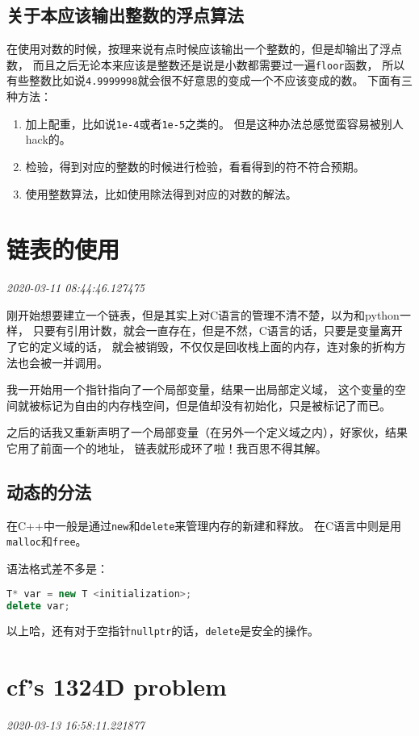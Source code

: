 \documentclass{peterlitsdoc}
\newcommand{\timetx}[1]
    {\par\noindent\emph{\pltgray\small #1}\vspace{2em}}
\newcommand{\vb}{\verb}
\begin{document}
\subsection{关于本应该输出整数的浮点算法}
在使用对数的时候，按理来说有点时候应该输出一个整数的，但是却输出了浮点数，
而且之后无论本来应该是整数还是说是小数都需要过一遍\vb|floor|函数，
所以有些整数比如说\vb|4.9999998|就会很不好意思的变成一个不应该变成的数。
下面有三种方法：

\begin{enumerate}
\item 加上配重，比如说\vb|1e-4|或者\vb|1e-5|之类的。
      但是这种办法总感觉蛮容易被别人hack的。
\item 检验，得到对应的整数的时候进行检验，看看得到的符不符合预期。
\item 使用整数算法，比如使用除法得到对应的对数的解法。
\end{enumerate}


\section{链表的使用}\timetx{2020-03-11 08:44:46.127475}

刚开始想要建立一个链表，但是其实上对C语言的管理不清不楚，以为和python一样，
只要有引用计数，就会一直存在，但是不然，C语言的话，只要是变量离开了它的定义域的话，
就会被销毁，不仅仅是回收栈上面的内存，连对象的折构方法也会被一并调用。

我一开始用一个指针指向了一个局部变量，结果一出局部定义域，
这个变量的空间就被标记为自由的内存栈空间，但是值却没有初始化，只是被标记了而已。

之后的话我又重新声明了一个局部变量（在另外一个定义域之内），好家伙，结果它用了前面一个的地址，
链表就形成环了啦！我百思不得其解。

\subsection{动态的分法}
在C++中一般是通过\vb|new|和\vb|delete|来管理内存的新建和释放。
在C语言中则是用\vb|malloc|和\vb|free|。

语法格式差不多是：
\begin{lstlisting}[language=C++]
T* var = new T <initialization>;
delete var;
\end{lstlisting}

以上哈，还有对于空指针\vb|nullptr|的话，\vb|delete|是安全的操作。


\section{cf's 1324D problem}\timetx{2020-03-13 16:58:11.221877}
\end{document}

